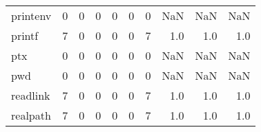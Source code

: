 \begin{tabular}{lrrrrrrrrr}
printenv  &                                                  0 &                                                  0 &                                                  0 &                                                  0 &                                                  0 &                                                  0 &                                                NaN &                                    NaN &                                  NaN \\
printf    &                                                  7 &                                                  0 &                                                  0 &                                                  0 &                                                  0 &                                                  7 &                                                1.0 &                                    1.0 &                                  1.0 \\
ptx       &                                                  0 &                                                  0 &                                                  0 &                                                  0 &                                                  0 &                                                  0 &                                                NaN &                                    NaN &                                  NaN \\
pwd       &                                                  0 &                                                  0 &                                                  0 &                                                  0 &                                                  0 &                                                  0 &                                                NaN &                                    NaN &                                  NaN \\
readlink  &                                                  7 &                                                  0 &                                                  0 &                                                  0 &                                                  0 &                                                  7 &                                                1.0 &                                    1.0 &                                  1.0 \\
realpath  &                                                  7 &                                                  0 &                                                  0 &                                                  0 &                                                  0 &                                                  7 &                                                1.0 &                                    1.0 &                                  1.0 \\

\end{tabular}
